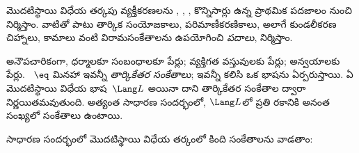 \documentclass[../../../include/open-logic-section]{subfiles}
\begin{document}



మొదటిస్థాయి విధేయ తర్కపు వ్యక్తీకరణలను \emph{},
\emph{}, \emph{}, కొన్నిసార్లు
\emph{} ఉన్న ప్రాథమిక పదజాలం నుంచి నిర్మిస్తాం. వాటితో
పాటు తార్కిక సంయోజకాలు, పరిమాణీకరణికాలు, అలాగే కుండలీకరణ చిహ్నాలు, కామాలు
వంటి విరామసంకేతాలను ఉపయోగించి \emph{పదాలు}, \emph{}
నిర్మిస్తాం.

\begin{explain}
అనౌపచారికంగా,  ధర్మాలకూ సంబంధాలకూ పేర్లు;
 వ్యక్తిగత వస్తువులకు పేర్లు; 
అన్వయాలకు పేర్లు. ~$\eq$ మినహా ఇవన్నీ
\emph{తార్కికేతర సంకేతాలు}; ఇవన్నీ కలిసి ఒక భాషను ఏర్పరుస్తాయి.
ఏ మొదటిస్థాయి విధేయ భాష~$\Lang L$ అయినా దాని తార్కికేతర సంకేతాల ద్వారా
నిర్ణయితమవుతుంది. అత్యంత సాధారణ సందర్భంలో, $\Lang L$లో ప్రతి రకానికి
అనంత సంఖ్యలో సంకేతాలు ఉంటాయి.
\end{explain}

సాధారణ సందర్భంలో మొదటిస్థాయి విధేయ తర్కంలో కింది సంకేతాలను వాడతాం:
\end{document}
